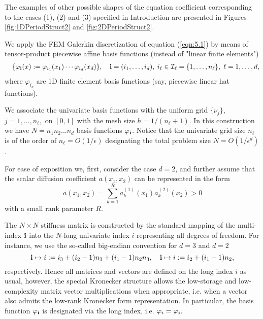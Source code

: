 \documentclass[amstex,amstext,amsfonts,epsf,12pt] {amsart}
\newcommand{\cred}{\color{red}}
\newcommand{\cn}{\color{black}}
\newcommand\be{\begin{eqnarray*}}
\newcommand\ee{\end{eqnarray*}}
\def\be{\begin{eqnarray*}}
\def\ee{\end{eqnarray*}}
\begin{document}
The examples of other possible shapes of the equation coefficient corresponding to
the cases (1), (2) and (3) specified in Introduction are presented in
Figures \ref{fig:1DPeriodStruct2} and \ref{fig:2DPeriodStruct2}.

We apply the FEM Galerkin discretization of equation (\ref{eqn:5.1}) by means of
tensor-product piecewise affine basis functions  (instead of "linear finite elements") 
\be
&&\{\varphi_{\bf i}(x):=\varphi_{i_1}(x_1) \cdots \varphi_{i_d}(x_d)\}, 
\quad {\bf i}=(i_1,\ldots,i_d), \; 
i_\ell\in {\mathcal I}_\ell=\{1,\ldots,n_\ell\}, \; \ell=1,\ldots,d,
\ee
where $\varphi_{i_k}$ are 1D finite element basis functions 
(say, piecewise linear hat functions).

We associate the univariate basis functions with the uniform 
grid $\{\nu_j\}$, $j=1,\ldots,n_\ell,$ on $[0,1]$ with the mesh size $h=1/(n_\ell+1)$.
In this construction we have  $N=n_1 n_2...n_d$ basis functions $\varphi_{\bf i}$.
Notice that the univariate grid size $n_\ell$ is of the order of $n_\ell=O(1/\epsilon)$
designating the total problem size $N=O(1/\epsilon^d)$.


For ease of exposition we, first, consider the case $d=2$, and
further assume that the scalar diffusion coefficient $a(x_1,x_2) $ can be 
represented  in the  form 
\[
 a(x_1,x_2) = \sum\limits^{R}_{k=1} a^{(1)}_k (x_1) a^{(2)}_k (x_2) > 0
\]
with a small rank parameter $R$. 


The $N\times N$ stiffness matrix is constructed by the standard mapping of the multi-index ${\bf i}$
into the $N$-long univariate index $i$ representing all degrees of freedom. 
For instance,  we use the so-called big-endian convention for $d=3$ and $d=2$
\[
 {\bf i}\mapsto i:= i_3 + (i_2-1)n_3 + (i_1-1)n_2 n_3, \quad {\bf i}\mapsto i:= i_2 + (i_1-1)n_2,
\]
respectively. Hence all matrices and vectors are defined on the long index $i$ as usual,
however, the special Kronecker structure allows the low-storage and low-complexity
matrix vector multiplications when appropriate, i.e. when a vector also admits the 
low-rank Kronecker form representation. 
 In particular, the basis function $\varphi_{\bf i}$ is designated 
via the long index, i.e. $\varphi_i=\varphi_{\bf i}$.  
\end{document}

